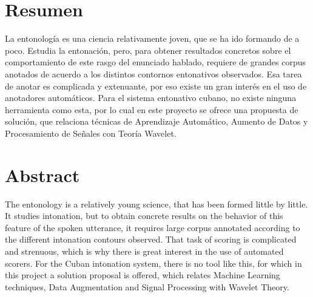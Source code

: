 \begin{comment}
content...
\end{comment}



\chapter*{Resumen}
La entonolog\'ia es una ciencia relativamente joven, que se ha ido formando de a poco. Estudia la entonaci\'on, pero, para obtener resultados concretos sobre el comportamiento de este rasgo del enunciado hablado, requiere de grandes corpus anotados de acuerdo a los distintos contornos entonativos observados. Esa tarea de anotar es complicada y extenuante, por eso existe un gran inter\'es en el uso de anotadores autom\'aticos. Para el sistema entonativo cubano, no existe ninguna herramienta como esta, por lo cual en este proyecto se ofrece una propuesta de soluci\'on, que relaciona t\'ecnicas de Aprendizaje Autom\'atico, Aumento de Datos y Procesamiento de Se\~nales con Teor\'ia Wavelet.






\chapter*{Abstract}
The entonology is a relatively young science, that has been formed little by little. It studies intonation, but to obtain concrete results on the behavior of this feature of the spoken utterance, it requires large corpus annotated according to the different intonation contours observed. That task of scoring is complicated and strenuous, which is why there is great interest in the use of automated scorers. For the Cuban intonation system, there is no tool like this, for which in this project a solution proposal is offered, which relates Machine Learning techniques, Data Augmentation and Signal Processing with Wavelet Theory.

